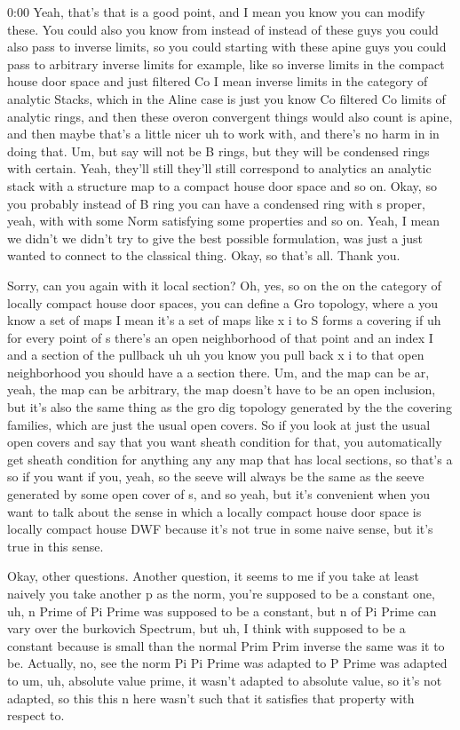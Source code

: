 \begin{unfinished}{0:00}
Yeah, that's that is a good point, and I mean you know you can modify these. You could also you know from instead of instead of these guys you could also pass to inverse limits, so you could starting with these apine guys you could pass to arbitrary inverse limits for example, like so inverse limits in the compact house door space and just filtered Co I mean inverse limits in the category of analytic Stacks, which in the Aline case is just you know Co filtered Co limits of analytic rings, and then these overon convergent things would also count is apine, and then maybe that's a little nicer uh to work with, and there's no harm in in doing that. Um, but say will not be B rings, but they will be condensed rings with certain. Yeah, they'll still they'll still correspond to analytics an analytic stack with a structure map to a compact house door space and so on. Okay, so you probably instead of B ring you can have a condensed ring with s proper, yeah, with with some Norm satisfying some properties and so on. Yeah, I mean we didn't we didn't try to give the best possible formulation, was just a just wanted to connect to the classical thing. Okay, so that's all. Thank you.

Sorry, can you again with it local section? Oh, yes, so on the on the category of locally compact house door spaces, you can define a Gro topology, where a you know a set of maps I mean it's a set of maps like x i to S forms a covering if uh for every point of s there's an open neighborhood of that point and an index I and a section of the pullback uh uh you know you pull back x i to that open neighborhood you should have a a section there. Um, and the map can be ar, yeah, the map can be arbitrary, the map doesn't have to be an open inclusion, but it's also the same thing as the gro dig topology generated by the the covering families, which are just the usual open covers. So if you look at just the usual open covers and say that you want sheath condition for that, you automatically get sheath condition for anything any any map that has local sections, so that's a so if you want if you, yeah, so the seeve will always be the same as the seeve generated by some open cover of s, and so yeah, but it's convenient when you want to talk about the sense in which a locally compact house door space is locally compact house DWF because it's not true in some naive sense, but it's true in this sense.

Okay, other questions. Another question, it seems to me if you take at least naively you take another p as the norm, you're supposed to be a constant one, uh, n Prime of Pi Prime was supposed to be a constant, but n of Pi Prime can vary over the burkovich Spectrum, but uh, I think with supposed to be a constant because is small than the normal Prim Prim inverse the same was it to be. Actually, no, see the norm Pi Pi Prime was adapted to P Prime was adapted to um, uh, absolute value prime, it wasn't adapted to absolute value, so it's not adapted, so this this n here wasn't such that it satisfies that property with respect to.


\end{unfinished}
